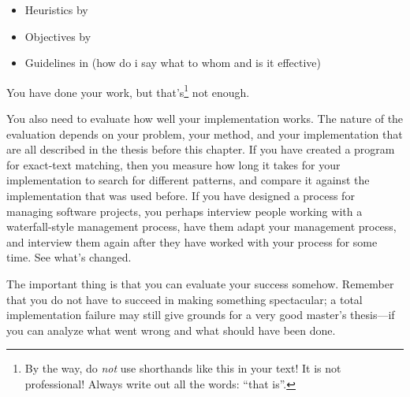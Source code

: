 
\begin{itemize}
	\item Heuristics by \citet{zuk_heuristics_2006}
	\item Objectives by \citet{schlichtmann_visualization_2002}
	\item Guidelines in \citet{kraak_cartographic_1998} (how do i say what to whom and is it effective)
\end{itemize}

You have done your work, but that's\footnote{By the way, do \emph{not} use
shorthands like this in your text! It is not professional! Always write out all
the words: ``that is''.} not enough. 

You also need to evaluate how well your implementation works.  The
nature of the evaluation depends on your problem, your method, and
your implementation that are all described in the thesis before this
chapter.  If you have created a program for exact-text matching, then
you measure how long it takes for your implementation to search for
different patterns, and compare it against the implementation that was
used before.  If you have designed a process for managing software
projects, you perhaps interview people working with a waterfall-style
management process, have them adapt your management process, and
interview them again after they have worked with your process for some
time. See what's changed.

The important thing is that you can evaluate your success somehow.
Remember that you do not have to succeed in making something spectacular; a
total implementation failure may still give grounds for a very good master's
thesis---if you can analyze what went wrong and what should have been done.

 
